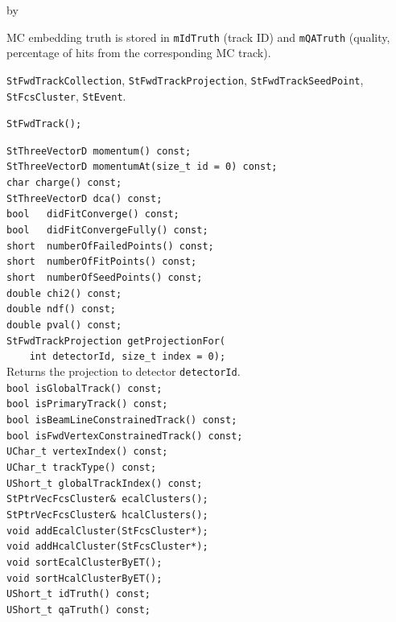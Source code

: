 \documentclass[twoside]{article}
\newcommand{\entrylabel}[1]{\mbox{\textbf{{#1}}}\hfil}%
\newenvironment{entry}
{\begin{list}{}%
    {\renewcommand{\makelabel}{\entrylabel}%
     \setlength{\labelwidth}{90pt}%
     \setlength{\leftmargin}{\labelwidth}
     \advance\leftmargin by \labelsep%
      }%
    }%
  {\end{list}}
\newcommand{\Entrylabel}[1]%
{\raisebox{0pt}[1ex][0pt]{\makebox[\labelwidth][l]%
    {\parbox[t]{\labelwidth}{\hspace{0pt}\textbf{{#1}}}}}}
\newenvironment{Entry}%
{\renewcommand{\entrylabel}{\Entrylabel}\begin{entry}}%
  {\end{entry}}
\begin{document}
\begin{Entry}
  MC embedding truth is stored in \texttt{mIdTruth} (track ID) and \texttt{mQATruth}
  (quality, percentage of hits from the corresponding MC track).
\item[Related Classes]
  \texttt{StFwdTrackCollection}, \texttt{StFwdTrackProjection},
  \texttt{StFwdTrackSeedPoint}, \texttt{StFcsCluster}, \texttt{StEvent}.
\item[Public\\ Constructors]
    \verb+StFwdTrack();+\\
\item[Public Member\\ Functions]
    \verb+StThreeVectorD momentum() const;+\\
    \verb+StThreeVectorD momentumAt(size_t id = 0) const;+\\
    \verb+char charge() const;+\\
    \verb+StThreeVectorD dca() const;+\\[2pt]
    \verb+bool   didFitConverge() const;+\\
    \verb+bool   didFitConvergeFully() const;+\\
    \verb+short  numberOfFailedPoints() const;+\\
    \verb+short  numberOfFitPoints() const;+\\
    \verb+short  numberOfSeedPoints() const;+\\
    \verb+double chi2() const;+\\
    \verb+double ndf() const;+\\
    \verb+double pval() const;+\\[2pt]
    \verb+StFwdTrackProjection getProjectionFor(+\\
    \verb+    int detectorId, size_t index = 0);+\\
    Returns the projection to detector \texttt{detectorId}.\\[2pt]
    \verb+bool isGlobalTrack() const;+\\
    \verb+bool isPrimaryTrack() const;+\\
    \verb+bool isBeamLineConstrainedTrack() const;+\\
    \verb+bool isFwdVertexConstrainedTrack() const;+\\
    \verb+UChar_t vertexIndex() const;+\\
    \verb+UChar_t trackType() const;+\\
    \verb+UShort_t globalTrackIndex() const;+\\[2pt]
    \verb+StPtrVecFcsCluster& ecalClusters();+\\
    \verb+StPtrVecFcsCluster& hcalClusters();+\\
    \verb+void addEcalCluster(StFcsCluster*);+\\
    \verb+void addHcalCluster(StFcsCluster*);+\\
    \verb+void sortEcalClusterByET();+\\
    \verb+void sortHcalClusterByET();+\\[2pt]
    \verb+UShort_t idTruth() const;+\\
    \verb+UShort_t qaTruth() const;+\\
\end{Entry}
\clearpage
\end{document}
